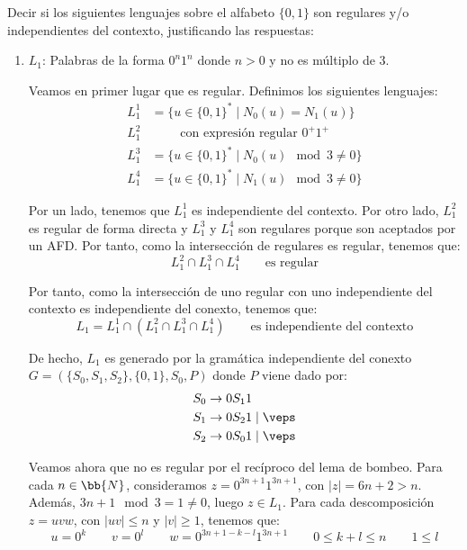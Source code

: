 \documentclass[12pt]{article}
\begin{document}
\begin{ejercicio}[1.25 puntos]
    Decir si los siguientes lenguajes sobre el alfabeto $\{0, 1\}$ son regulares y/o independientes del contexto, justificando las respuestas:
    \begin{enumerate}
        \item $L_1$: Palabras de la forma $0^n1^n$ donde $n > 0$ y no es múltiplo de $3$.
        
        Veamos en primer lugar que es regular. Definimos los siguientes lenguajes:
        \begin{align*}
            L_1^1 &= \{u\in \{0,1\}^*\mid N_0(u)=N_1(u)\}\\
            L_1^2 & \qquad \text{ con expresión regular } 0^+1^+\\
            L_1^3 &= \{u\in \{0,1\}^*\mid N_0(u)\mod 3\neq 0\}\\
            L_1^4 &= \{u\in \{0,1\}^*\mid N_1(u)\mod 3\neq 0\}
        \end{align*}

        Por un lado, tenemos que $L_1^1$ es independiente del contexto. Por otro lado, $L_1^2$ es regular de forma directa y $L_1^3$ y $L_1^4$ son regulares porque son aceptados por un AFD. Por tanto, como la intersección de regulares es regular, tenemos que:
        \begin{equation*}
            L_1^2 \cap L_1^3 \cap L_1^4 \qquad \text{es regular}
        \end{equation*}

        Por tanto, como la intersección de uno regular con uno independiente del contexto es independiente del conexto, tenemos que:
        \begin{equation*}
            L_1 = L_1^1 \cap \left(L_1^2 \cap L_1^3 \cap L_1^4\right) \qquad \text{es independiente del contexto}
        \end{equation*}

        De hecho, $L_1$ es generado por la gramática independiente del conexto $G=(\{S_0,S_1,S_2\}, \{0,1\}, S_0, P)$ donde $P$ viene dado por:
        \begin{align*}
            S_0 &\rightarrow 0S_1 1\\
            S_1 &\rightarrow 0S_2 1\mid \veps\\
            S_2 &\rightarrow 0S_0 1\mid \veps
        \end{align*}

        Veamos ahora que no es regular por el recíproco del lema de bombeo. Para cada $n\in \bb{N}$, consideramos $z=0^{3n+1}1^{3n+1}$, con $|z|=6n+2>n$. Además, $3n+1\mod 3=1\neq 0$, luego $z\in L_1$. Para cada descomposición $z=uvw$, con $|uv|\leq n$ y $|v|\geq 1$, tenemos que:
        \begin{equation*}
            u=0^k \qquad v=0^l\qquad w=0^{3n+1-k-l}1^{3n+1}
            \qquad 0\leq k+l\leq n \qquad 1\leq l
        \end{equation*}


\end{enumerate}
\end{ejercicio}
\end{document}
